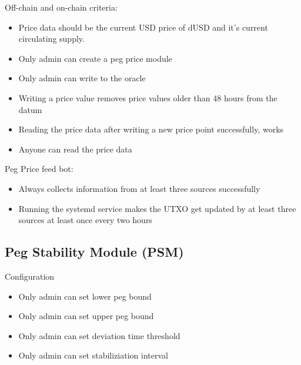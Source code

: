 \documentclass{article} %
\begin{document}
Off-chain and on-chain criteria:
\begin{itemize}
  \item Price data should be the current USD price of dUSD and it's current
   circulating supply.
  \item Only admin can create a peg price module
  \item Only admin can write to the oracle
  \item Writing a price value removes price values older than 48 hours from the
    datum
  \item Reading the price data after writing a new price point successfully,
    works
  \item Anyone can read the price data
\end{itemize}

Peg Price feed bot:
\begin{itemize}
  \item Always collects information from at least three sources successfully
  \item Running the systemd service makes the UTXO get updated by at least three
    sources at least once every two hours
\end{itemize}

\subsection{Peg Stability Module (PSM)}

Configuration
\begin{itemize}
  \item Only admin can set lower peg bound
  \item Only admin can set upper peg bound
  \item Only admin can set deviation time threshold
  \item Only admin can set stabiliziation interval
\end{itemize}
\end{document}
